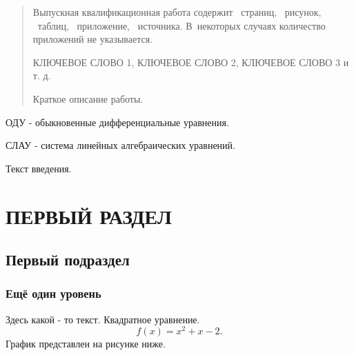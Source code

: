 \documentclass{bacgost}
\begin{document}
\begin{abstract}
Выпускная квалификационная работа содержит \pageref*{LastPage}~страниц, ~рисунок, ~таблиц, ~приложение, ~источника. В~некоторых случаях количество приложений не указывается.

КЛЮЧЕВОЕ СЛОВО 1, КЛЮЧЕВОЕ СЛОВО 2, КЛЮЧЕВОЕ СЛОВО 3 и т. д.

Краткое описание работы.
\end{abstract}


\gosttableofcontents


\begin{lofab}
ОДУ - обыкновенные дифференциальные уравнения.

СЛАУ - система линейных алгебраических уравнений.
\end{lofab}


Текст введения.


\mainpart


\section{ПЕРВЫЙ РАЗДЕЛ}
\subsection{Первый подраздел}
\subsubsection{Ещё один уровень}
Здесь какой - то текст. Квадратное уравнение.
\begin{equation}
f(x) = x^2 + x-2.
\end{equation}
График представлен на рисунке ниже.
\begin{gostfigure}
\begin{center} 
\end{center}
\end{gostfigure}
\end{document}
